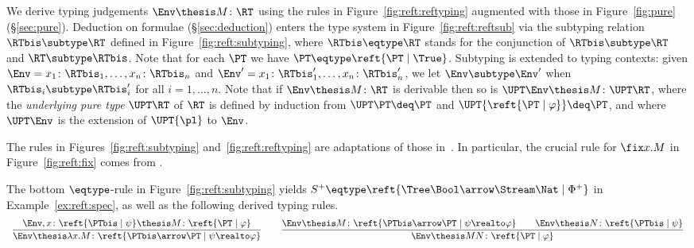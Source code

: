 We derive typing judgements $\Env \thesis M \colon \RT$
using the rules in Figure~\ref{fig:reft:reftyping}
augmented with those in Figure~\ref{fig:pure} (\S\ref{sec:pure}).
Deduction on formulae (\S\ref{sec:deduction})
enters the type system in Figure~\ref{fig:reft:reftsub}
via the subtyping relation $\RTbis \subtype \RT$
defined in Figure~\ref{fig:reft:subtyping},
where $\RTbis \eqtype \RT$
stands for the conjunction of $\RTbis \subtype \RT$ and $\RT \subtype \RTbis$.
Note that for each $\PT$ we have $\PT \eqtype \reft{\PT \mid \True}$.
%
Subtyping is extended to typing contexts:
given $\Env = x_1 \colon \RTbis_1,\dots,x_n \colon\RTbis_n$
and $\Env' = x_1 \colon \RTbis'_1,\dots,x_n \colon \RTbis'_n$,
we let $\Env \subtype \Env'$ when $\RTbis_i \subtype \RTbis'_i$
for all $i =1,\dots,n$.
%
Note that if $\Env \thesis M \colon \RT$ is derivable
then so is $\UPT\Env \thesis M \colon \UPT\RT$,
where the \emph{underlying pure type} $\UPT\RT$ of $\RT$
is defined by induction from $\UPT\PT \deq \PT$
and $\UPT{\reft{\PT \mid \varphi}} \deq \PT$,
and where $\UPT\Env$ is the extension of $\UPT{\pl}$ to $\Env$.




The rules in Figures~\ref{fig:reft:subtyping} and~\ref{fig:reft:reftyping}
are adaptations of those in~\cite{abramsky91apal,bk03ic,jr21esop,rk25wollic}.
In particular, the crucial rule for $\fix x.M$ in Figure~\ref{fig:reft:fix}
comes from \cite{abramsky91apal}.

\begin{example}
The bottom $\eqtype$-rule in Figure~\ref{fig:reft:subtyping} yields
$S^+ \eqtype \reft{\Tree\Bool \arrow \Stream\Nat \mid \Phi^+}$
in Example~\ref{ex:reft:spec},
as well as the following derived typing rules.
\[
\begin{array}{c}
%
\dfrac{\Env,x \colon \reft{\PTbis \mid \psi} \thesis M \colon \reft{\PT \mid \varphi}}
  {\Env \thesis \lambda x.M \colon \reft{\PTbis \arrow \PT \mid \psi \realto \varphi}}
%
\qquad
%
\dfrac{\Env \thesis M \colon \reft{\PTbis \arrow \PT \mid \psi \realto \varphi}
  \qquad
  \Env \thesis N \colon \reft{\PTbis \mid \psi}}
  {\Env \thesis M N \colon \reft{\PT \mid \varphi}}
%
\end{array}
\]
\end{example}


